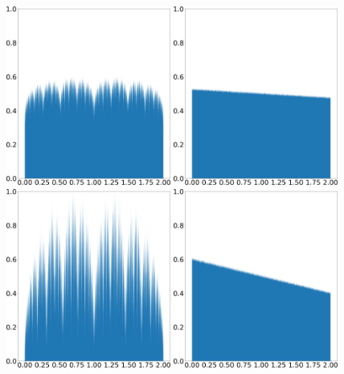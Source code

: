 \begin{figure}
    \centering
    \includegraphics[width=0.48\textwidth]{tent_pinched_shadow_density_0.05.png}
    \hspace{0.02\textwidth}
    \includegraphics[width=0.48\textwidth]{tent_pinched_physical_density_0.05.png}
    \\ \vspace{0.02\textwidth}
    \includegraphics[width=0.48\textwidth]{tent_pinched_shadow_density_0.2.png}
    \hspace{0.02\textwidth}
    \includegraphics[width=0.48\textwidth]{tent_pinched_physical_density_0.2.png}

\end{figure}
